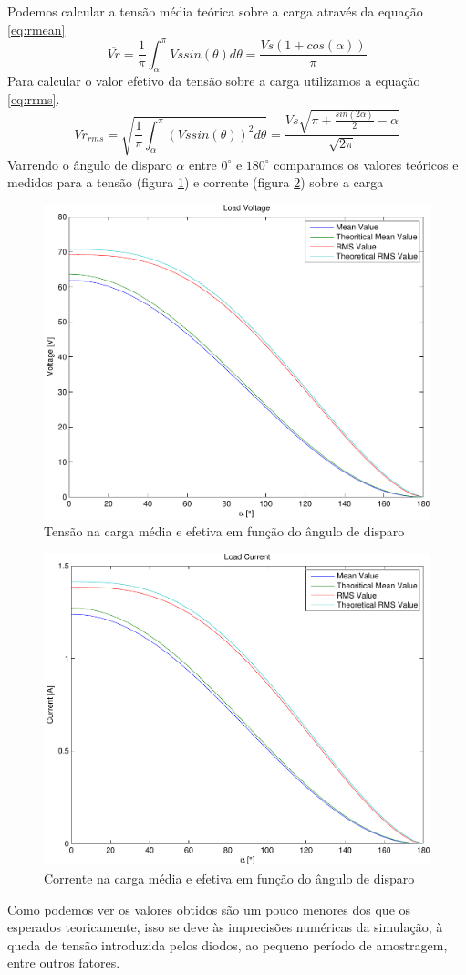 \documentclass{report}
\begin{document}
Podemos calcular a tensão média teórica sobre a carga através da equação \ref{eq:rmean}
\begin{equation}
	\overline{Vr} = \frac{1}{\pi} \int_{\alpha}^{\pi}{Vs sin(\theta)d\theta} = \frac{Vs (1 + cos(\alpha))}{\pi}
	\label{eq:rmean}
\end{equation}
Para calcular o valor efetivo da tensão sobre a carga utilizamos a equação \ref{eq:rrms}.
\begin{equation}
	Vr_{rms} = \sqrt{\frac{1}{\pi} \int_{\alpha}^{\pi}{(Vs sin(\theta))^2 d\theta}} = \frac{Vs \sqrt{\pi + \frac{sin(2\alpha)}{2}- \alpha }}{\sqrt{2 \pi}} 
	\label{eq:rrms}
\end{equation}
Varrendo o ângulo de disparo $\alpha$ entre $0^\circ$ e $180^\circ$ comparamos os valores teóricos e medidos para a tensão (figura \ref{fig:rvrr}) e corrente (figura \ref{fig:rirr}) sobre a carga
\begin{figure}[H]
	\centering
	\includegraphics[width=0.7\linewidth]{matlab/r_vrr}
	\caption{Tensão na carga média e efetiva em função do ângulo de disparo}
	\label{fig:rvrr}
\end{figure}
\begin{figure}[H]
	\centering
	\includegraphics[width=0.7\linewidth]{matlab/r_irr}
	\caption{Corrente na carga média e efetiva em função do ângulo de disparo}
	\label{fig:rirr}
\end{figure}
Como podemos ver os valores obtidos são um pouco menores dos que os esperados teoricamente, isso se deve às imprecisões numéricas da simulação, à queda de tensão introduzida pelos diodos, ao pequeno período de amostragem, entre outros fatores.
\end{document}
